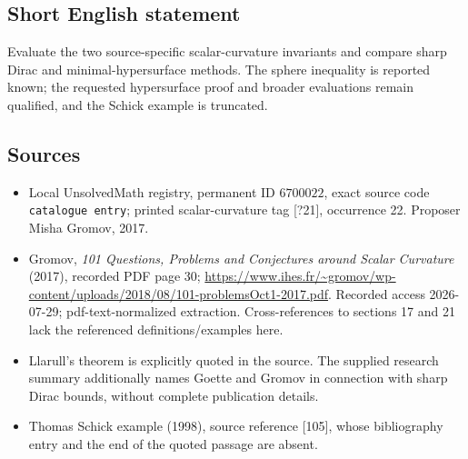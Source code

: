 \documentclass[11pt]{article}
\begin{document}
\subsection{Short English statement}
Evaluate the two source-specific scalar-curvature invariants and compare sharp Dirac and minimal-hypersurface methods. The sphere inequality is reported known; the requested hypersurface proof and broader evaluations remain qualified, and the Schick example is truncated.
\subsection{Sources}
\begin{itemize}
\item Local UnsolvedMath registry, permanent ID \(6700022\), exact source code \texttt{catalogue entry}; printed scalar-curvature tag [?21], occurrence 22. Proposer Misha Gromov, 2017.
\item Gromov, \emph{101 Questions, Problems and Conjectures around Scalar Curvature} (2017), recorded PDF page 30; \url{https://www.ihes.fr/~gromov/wp-content/uploads/2018/08/101-problemsOct1-2017.pdf}. Recorded access 2026-07-29; pdf-text-normalized extraction. Cross-references to sections 17 and 21 lack the referenced definitions/examples here.
\item Llarull's theorem is explicitly quoted in the source. The supplied research summary additionally names Goette and Gromov in connection with sharp Dirac bounds, without complete publication details.
\item Thomas Schick example (1998), source reference [105], whose bibliography entry and the end of the quoted passage are absent.
\end{itemize}
\end{document}

